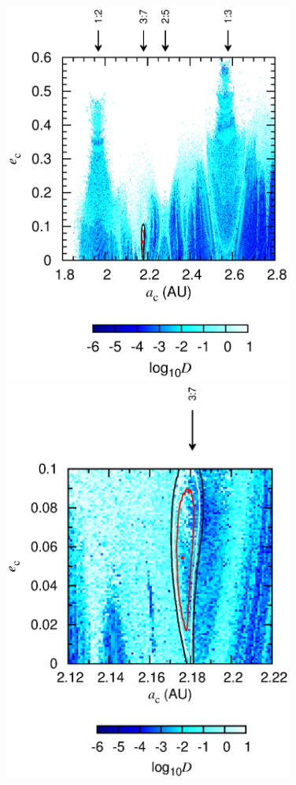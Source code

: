 \documentclass[]{pasj01}
\begin{document}
\begin{figure}
 \begin{minipage}{0.48\hsize}
\begin{center}
\includegraphics[width=0.85\textwidth]{stability_acec.eps}
\end{center}
\end{minipage}
 \hfill
 \begin{minipage}{0.48\hsize}
\begin{center}
\includegraphics[width=0.85\textwidth]{figacecv2.eps}

\end{center}
\end{minipage}
\end{figure}
\end{document}
